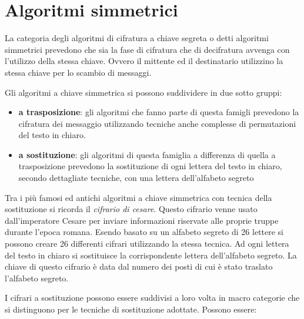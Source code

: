 \documentclass[11pt, a4paper, oneside]{Thesis} %
\begin{document}
\section{Algoritmi simmetrici}
La categoria degli algoritmi di cifratura a chiave segreta o detti algoritmi simmetrici prevedono che sia la fase di cifratura che di decifratura avvenga con
l'utilizzo della stessa chiave. Ovvero il mittente ed il destinatario utilizzino la stessa chiave per lo scambio di messaggi.
\par Gli algoritmi a chiave simmetrica si possono suddividere in due sotto gruppi:
\begin{itemize}
 \item \textbf{a trasposizione}: gli algoritmi che fanno parte di questa famigli prevedono la cifratura dei messaggio utilizzando tecniche anche complesse di permutazioni del testo in chiaro.
 \item \textbf{a sostituzione}: gli algoritmi di questa famiglia a differenza di quella a trasposizione prevedono la sostituzione di ogni lettera del testo in chiaro, secondo dettagliate tecniche, 
 con una lettera dell'alfabeto segreto
\end{itemize}
Tra i più famosi ed antichi algoritmi a chiave simmetrica con tecnica della sostituzione si ricorda il \textit{cifrario di cesare}. Questo cifrario venne usato dall'imperatore Cesare per inviare informazioni
riservate alle proprie truppe durante l'epoca romana. Esendo basato su un alfabeto segreto di 26 lettere si possono creare 26 differenti cifrari utilizzando la stessa tecnica. Ad ogni lettera del testo
in chiaro si sostituisce la corrispondente lettera dell'alfabeto segreto. La chiave di questo cifrario è data dal numero dei posti di cui è stato traslato l'alfabeto segreto.
\par I cifrari a sostituzione possono essere suddivisi a loro volta in macro categorie che si distinguono per le tecniche di sostituzione adottate.
Possono essere:
\end{document}
